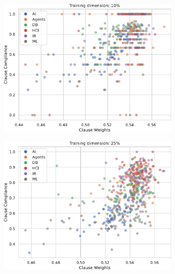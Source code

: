 \begin{figure}
	\centering
	\begin{subfigure}{.5\textwidth}
		\centering
		\includegraphics[width=0.95\linewidth]{figures/scatter_10.pdf}
		\label{fig:aa}
	\end{subfigure}%
	\begin{subfigure}{.5\textwidth}
		\centering
		\includegraphics[width=0.95\linewidth]{figures/scatter_25.pdf}
		\label{fig:vv}	
	\end{subfigure}\\
	\begin{subfigure}{.5\textwidth}
	\centering

\end{subfigure}
\end{figure}
